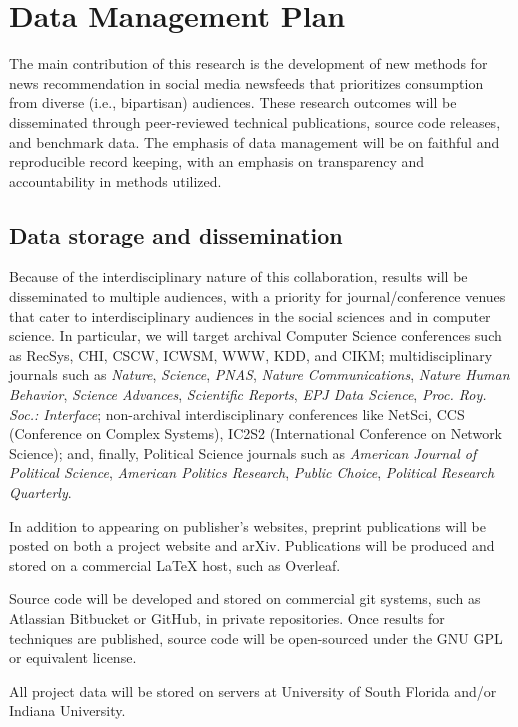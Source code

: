 \section*{Data Management Plan}

The main contribution of this research is the development of new methods for news recommendation in social media newsfeeds that prioritizes consumption from diverse (i.e., bipartisan) audiences.
%
These research outcomes will be disseminated through peer-reviewed technical publications, source code releases, and benchmark data. The emphasis of data management will be on faithful and
reproducible record keeping, with an emphasis on transparency and accountability in methods utilized.

\subsection*{Data storage and dissemination}

Because of the interdisciplinary nature of this collaboration, results will be disseminated to multiple audiences, with a priority for journal/conference venues that cater to interdisciplinary audiences in the social sciences and in computer science. In particular, we will target archival Computer Science conferences such as RecSys, CHI, CSCW, ICWSM, WWW, KDD, and CIKM; multidisciplinary journals such as \emph{Nature}, \emph{Science}, \emph{PNAS}, \emph{Nature Communications}, \emph{Nature Human Behavior}, \emph{Science Advances}, \emph{Scientific Reports}, \emph{EPJ Data Science}, \emph{Proc. Roy. Soc.: Interface}; non-archival interdisciplinary conferences like NetSci, CCS (Conference on Complex Systems), IC2S2 (International Conference on Network Science); and, finally, Political Science journals such as \emph{American Journal of Political Science}, \emph{American Politics Research}, \emph{Public Choice}, \emph{Political Research Quarterly}. 

In addition to appearing on publisher's websites, preprint publications will be posted on both a project website and arXiv. Publications will be produced and stored on a commercial LaTeX host, such as Overleaf.

Source code will be developed and stored on commercial git systems, such as Atlassian Bitbucket or GitHub, in private repositories. Once results for techniques are published, source code will be open-sourced under the GNU GPL or equivalent license.

All project data will be stored on servers at University of South Florida and/or Indiana University.

